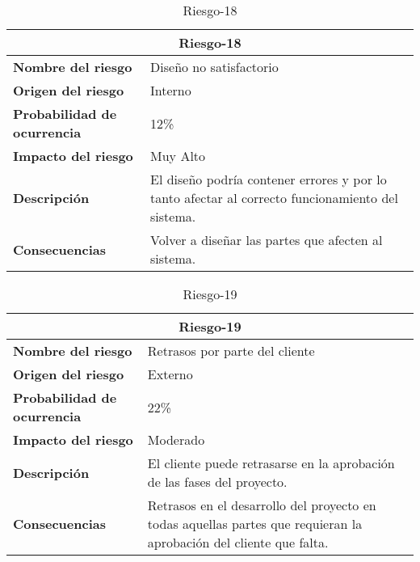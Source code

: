 \begin{table}[H]
\begin{center}
\begin{tabular}{p{} p{7cm}}
\multicolumn{2}{c}{\textbf{Riesgo-18} } \\
\hline \hline
\textbf{Nombre del riesgo} & Diseño no satisfactorio \\
\hline
\textbf{Origen del riesgo} & Interno\\
\hline
\textbf{Probabilidad de ocurrencia} &  12\% \\
\hline
\textbf{Impacto del riesgo} & Muy Alto  \\
\hline
\textbf{Descripción} &  El diseño podría contener errores y por lo tanto afectar al correcto funcionamiento del sistema.  \\
\hline
\textbf{Consecuencias} &  Volver a diseñar las partes que afecten al sistema.  \\
\hline
\end{tabular}
\caption{Riesgo-18}
\label{tab:Riesgo-18}
\end{center}
\end{table}

\begin{table}[H]
\begin{center}
\begin{tabular}{p{} p{7cm}}
\multicolumn{2}{c}{\textbf{Riesgo-19} } \\
\hline \hline
\textbf{Nombre del riesgo} &  Retrasos por parte del cliente \\
\hline
\textbf{Origen del riesgo} & Externo\\
\hline
\textbf{Probabilidad de ocurrencia} &  22\% \\
\hline
\textbf{Impacto del riesgo} &  Moderado \\
\hline
\textbf{Descripción} & El cliente puede retrasarse en la aprobación de las fases del proyecto.   \\
\hline
\textbf{Consecuencias} & Retrasos en el desarrollo del proyecto en todas aquellas partes que requieran la aprobación del cliente que falta.   \\
\hline
\end{tabular}
\caption{Riesgo-19}
\label{tab:Riesgo-19}
\end{center}
\end{table}

